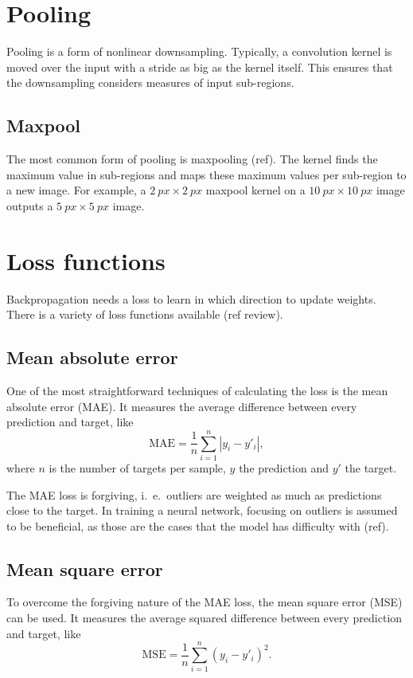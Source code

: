 \section{Pooling}\label{sec:pooling}
Pooling is a form of nonlinear downsampling.
Typically, a convolution kernel is moved over the input with a stride as big as the kernel itself.
This ensures that the downsampling considers measures of input sub-regions.

\subsection{Maxpool}\label{subsec:maxpool}
The most common form of pooling is maxpooling (ref).
The kernel finds the maximum value in sub-regions and maps these maximum values per sub-region to a new image.
For example, a $\SI{2}{px}\times\SI{2}{px}$ maxpool kernel on a $\SI{10}{px}\times\SI{10}{px}$ image outputs a $\SI{5}{px}\times\SI{5}{px}$ image.



\section{Loss functions}
Backpropagation needs a loss to learn in which direction to update weights.
There is a variety of loss functions available (ref review).

\subsection{Mean absolute error}
One of the most straightforward techniques of calculating the loss is the mean absolute error (MAE).
It measures the average difference between every prediction and target, like
\begin{equation}
    \mathrm{MAE} = \frac{1}{n} \sum_{i=1}^{n} |y_i - y'_i|,
\end{equation}
where $n$ is the number of targets per sample, $y$ the prediction and $y'$ the target.

The MAE loss is forgiving, i.\ e.\ outliers are weighted as much as predictions close to the target.
In training a neural network, focusing on outliers is assumed to be beneficial, as those are the cases that the model has difficulty with (ref).

\subsection{Mean square error}
To overcome the forgiving nature of the MAE loss, the mean square error (MSE) can be used.
It measures the average squared difference between every prediction and target, like
\begin{equation}
    \mathrm{MSE} = \frac{1}{n} \sum_{i=1}^n (y_i - y'_i)^2.
\end{equation}

